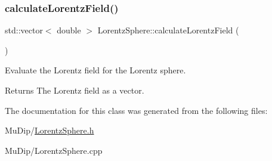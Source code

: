 \subsubsection{\texorpdfstring{calculate\+Lorentz\+Field()}{calculateLorentzField()}}
{\footnotesize\ttfamily std\+::vector$<$ double $>$ Lorentz\+Sphere\+::calculate\+Lorentz\+Field (\begin{DoxyParamCaption}{ }\end{DoxyParamCaption})}

Evaluate the Lorentz field for the Lorentz sphere. \begin{DoxyReturn}{Returns}
The Lorentz field as a vector. 
\end{DoxyReturn}


The documentation for this class was generated from the following files\+:\begin{DoxyCompactItemize}
\item 
Mu\+Dip/\mbox{\hyperlink{_lorentz_sphere_8h}{Lorentz\+Sphere.\+h}}\item 
Mu\+Dip/Lorentz\+Sphere.\+cpp\end{DoxyCompactItemize}
